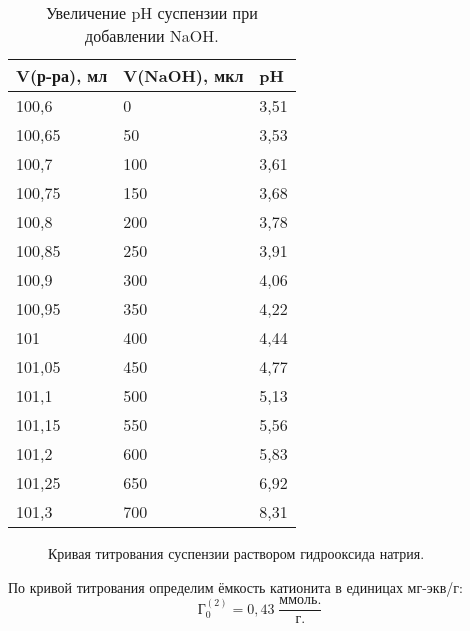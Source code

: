 \documentclass[a4paper,12pt]{article} %
\begin{document}
\begin{table}[H]
\centering
    \begin{tabular}{|l|l|l|}
    \hline
        V(р-ра), мл & V(NaOH), мкл & pH \\ \hline
        100,6 & 0 & 3,51 \\ \hline
        100,65 & 50 & 3,53 \\ \hline
        100,7 & 100 & 3,61 \\ \hline
        100,75 & 150 & 3,68 \\ \hline
        100,8 & 200 & 3,78 \\ \hline
        100,85 & 250 & 3,91 \\ \hline
        100,9 & 300 & 4,06 \\ \hline
        100,95 & 350 & 4,22 \\ \hline
        101 & 400 & 4,44 \\ \hline
        101,05 & 450 & 4,77 \\ \hline
        101,1 & 500 & 5,13 \\ \hline
        101,15 & 550 & 5,56 \\ \hline
        101,2 & 600 & 5,83 \\ \hline
        101,25 & 650 & 6,92 \\ \hline
        101,3 & 700 & 8,31 \\ \hline
    \end{tabular} 
    \caption{Увеличение pH суспензии при добавлении NaOH.}
\end{table}

\begin{figure}[H]
\centering
 \caption{Кривая титрования суспензии раствором гидрооксида натрия. }
\end{figure}

По кривой титрования определим ёмкость катионита в единицах мг-экв/г:
\begin{equation*}
    \textit{Г}_0^{(2)} = 0,43 \; \frac{ммоль.}{г.}
\end{equation*}
\end{document}
